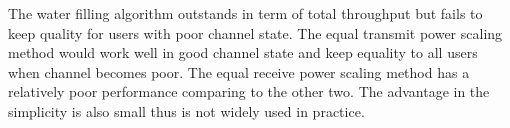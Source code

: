 \documentclass{article}
\begin{document}
\noindent
The water filling algorithm outstands in term of total throughput but fails to keep quality for users with poor channel state.
The equal transmit power scaling method would work well in good channel state and keep equality to all users when channel becomes poor.
The equal receive power scaling method has a relatively poor performance comparing to the other two. The advantage in the simplicity is also small thus is not widely used in practice.


{}
\end{document}
